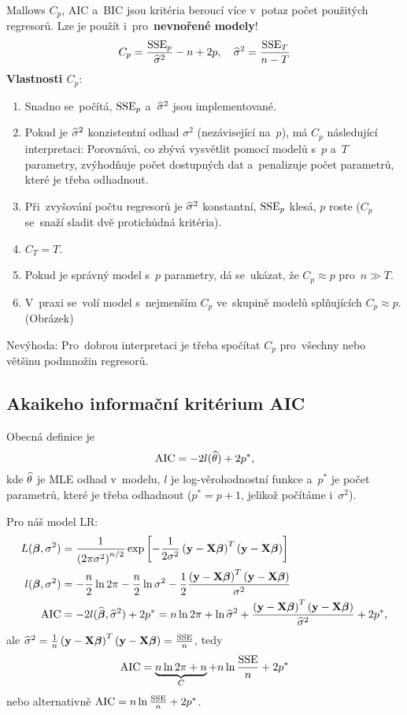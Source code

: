 Mallows $C_p$, AIC a~BIC jsou kritéria beroucí více v~potaz počet použitých regresorů. Lze je použít i~pro~\textbf{nevnořené modely}!
 $$
C_p = \frac{\mathrm{SSE}_p}{\widehat{\sigma}^2} - n + 2p, \quad \widehat{\sigma}^2 = \frac{\mathrm{SSE}_T}{n-T}
 $$
\textbf{Vlastnosti $C_p$}:
\begin{enumerate}[1)]
\item Snadno se~počítá, $\mathrm{SSE}_p$ a~$\widehat{\sigma}^2$ jsou implementované.
\item Pokud je $\widehat{\sigma}^2$ konzistentní odhad $\sigma^2$ (nezávisející na~$p$), má $C_p$ následující interpretaci: Porovnává, co zbývá vysvětlit pomocí modelů s~$p$ a~$T$ parametry, zvýhodňuje počet dostupných dat a~penalizuje počet parametrů, které je třeba odhadnout.
\item Při~zvyšování počtu regresorů je $\widehat{\sigma}^2$ konstantní, $\mathrm{SSE}_p$ klesá, $p$ roste ($C_p$ se~snaží sladit dvě protichůdná kritéria).
\item $C_T = T$.
\item Pokud je správný model s~$p$ parametry, dá se~ukázat, že $C_p \approx p$ pro~$n \gg T$.
\item V~praxi se~volí model s~nejmenším $C_p$ ve~skupině modelů splňujících $C_p \approx p$. (Obrázek)
\end{enumerate}

\begin{remark}
Nevýhoda: Pro~dobrou interpretaci je třeba spočítat $C_p$ pro~všechny nebo většinu podmnožin regresorů.
\end{remark}

\subsection{Akaikeho informační kritérium AIC}

Obecná definice je
 $$
\mathrm{AIC} = -2l(\widehat{\theta}) + 2p^*,
 $$
kde $\widehat{\theta}$ je MLE odhad v~modelu, $l$ je log-věrohodnostní funkce a~$p^*$ je počet parametrů, které je třeba odhadnout ($p^* = p + 1$, jelikož počítáme i~$\sigma^2$).

Pro náš model LR:
\begin{align*}
L(\boldsymbol{\beta},\sigma^2) & = \frac{1}{\left(2\pi \sigma^2\right)^{n/2}} \exp \left[- \frac{1}{2\sigma^2} \left(\mathbf{y} - \mathbf{X} \boldsymbol{\beta} \right)^T \left(\mathbf{y} - \mathbf{X} \boldsymbol{\beta} \right) \right] \\
l(\boldsymbol{\beta}, \sigma^2) & = - \frac{n}{2} \ln 2\pi - \frac{n}{2} \ln \sigma^2 - \frac{1}{2} \frac{\left(\mathbf{y} - \mathbf{X} \boldsymbol{\beta} \right)^T \left(\mathbf{y} - \mathbf{X} \boldsymbol{\beta} \right)}{\sigma^2} \\
\mathrm{AIC} & = -2l(\widehat{\boldsymbol{\beta}}, \widehat{\sigma}^2) + 2p^* = n \ln 2\pi + \ln \widehat{\sigma}^2 + \frac{\left(\mathbf{y} - \mathbf{X} \boldsymbol{\beta} \right)^T \left(\mathbf{y} - \mathbf{X} \boldsymbol{\beta} \right)}{\widehat{\sigma}^2} + 2p^*,
\end{align*}
ale $\widehat{\sigma}^2 = \frac{1}{n} \left(\mathbf{y} - \mathbf{X} \boldsymbol{\beta} \right)^T \left(\mathbf{y} - \mathbf{X} \boldsymbol{\beta} \right) = \frac{\mathrm{SSE}}{n}$, tedy
 $$
\mathrm{AIC} = \underbrace{n \ln 2 \pi + n}_C + n \ln \frac{\mathrm{SSE}}{n} + 2p^*
 $$
nebo alternativně $\mathrm{AIC} = n \ln \frac{\mathrm{SSE}}{n} + 2p^*$.

